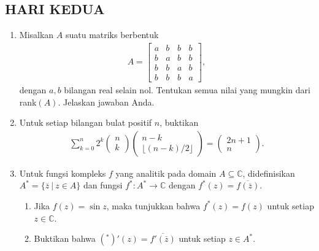 \documentclass[12pt,twoside]{article}
\begin{document}
\subsection{HARI KEDUA}
\begin{enumerate}
    \item Misalkan $A$ suatu matriks berbentuk
          \begin{align*}
              A=\begin{bmatrix}
                    a & b & b & b \\
                    b & a & b & b \\
                    b & b & a & b \\
                    b & b & b & a
                \end{bmatrix},
          \end{align*}
          dengan $a,b$ bilangan real selain nol. Tentukan semua nilai yang mungkin dari rank$(A)$. Jelaskan jawaban Anda.
    \item Untuk setiap bilangan bulat positif $n$, buktikan
          \begin{align*}
              \sum_{k=0}^n 2^k \begin{pmatrix}
                                   n \\k
                               \end{pmatrix}\begin{pmatrix}
                                                n-k \\
                                                \lfloor (n-k)/2\rfloor
                                            \end{pmatrix} = \begin{pmatrix}
                                                                2n+1 \\n
                                                            \end{pmatrix}.
          \end{align*}
    \item Untuk fungsi kompleks $f$ yang analitik pada domain $A\subseteq \mathbb{C}$, didefinisikan $A^*=\{\overline{z}~|~z\in A\}$ dan fungsi $f^*:A^*\to \mathbb{C}$ dengan $f^*(z)=\overline{f(\overline{z})}$.
          \begin{enumerate}
              \item Jika $f(z)=\sin z$, maka tunjukkan bahwa $f^*(z)=f(z)$ untuk setiap $z\in\mathbb{C}$.
              \item Buktikan bahwa $(^*)'(z)=\overline{f'(\overline{z})}$ untuk setiap $z\in A^*$.

\end{enumerate}
\end{enumerate}
\end{document}
